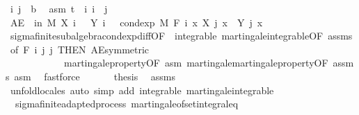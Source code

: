 \begin{isabellebody}
\ i\ j\ {\isacharcolon}{\kern0pt}{\isacharcolon}{\kern0pt}\ {\isacharprime}{\kern0pt}b\ \isamarkupfalse%
\ asm{\isacharcolon}{\kern0pt}\ {\isachardoublequoteopen}t\ {\isasymle}\ i{\isachardoublequoteclose}\ {\isachardoublequoteopen}i\ {\isasymle}\ j{\isachardoublequoteclose}\isanewline
\ \ \ \ \isamarkupfalse%
\ {\isachardoublequoteopen}AE\ {\isasymxi}\ in\ M{\isachardot}{\kern0pt}\ X\ i\ {\isasymxi}\ {\isacharminus}{\kern0pt}\ Y\ i\ {\isasymxi}\ {\isacharequal}{\kern0pt}\ cond{\isacharunderscore}{\kern0pt}exp\ M\ {\isacharparenleft}{\kern0pt}F\ i{\isacharparenright}{\kern0pt}\ {\isacharparenleft}{\kern0pt}{\isasymlambda}x{\isachardot}{\kern0pt}\ X\ j\ x\ {\isacharminus}{\kern0pt}\ Y\ j\ x{\isacharparenright}{\kern0pt}\ {\isasymxi}{\isachardoublequoteclose}\ \isanewline
\ \ \ \ \ \ \isamarkupfalse%
\ sigma{\isacharunderscore}{\kern0pt}finite{\isacharunderscore}{\kern0pt}subalgebra{\isachardot}{\kern0pt}cond{\isacharunderscore}{\kern0pt}exp{\isacharunderscore}{\kern0pt}diff{\isacharbrackleft}{\kern0pt}OF\ {\isacharunderscore}{\kern0pt}\ integrable\ martingale{\isachardot}{\kern0pt}integrable{\isacharbrackleft}{\kern0pt}OF\ assms{\isacharbrackright}{\kern0pt}{\isacharcomma}{\kern0pt}\ of\ {\isachardoublequoteopen}F\ i{\isachardoublequoteclose}\ j\ j{\isacharcomma}{\kern0pt}\ THEN\ AE{\isacharunderscore}{\kern0pt}symmetric{\isacharbrackright}{\kern0pt}\ \isanewline
\ \ \ \ \ \ \ \ \ \ \ \ martingale{\isacharunderscore}{\kern0pt}property{\isacharbrackleft}{\kern0pt}OF\ asm{\isacharbrackright}{\kern0pt}\ martingale{\isachardot}{\kern0pt}martingale{\isacharunderscore}{\kern0pt}property{\isacharbrackleft}{\kern0pt}OF\ assms\ asm{\isacharbrackright}{\kern0pt}\ \isamarkupfalse%
\ fastforce\isanewline
\ \ \isacommand{{\isacharbraceright}{\kern0pt}}\isamarkupfalse%
\isanewline
\ \ \isamarkupfalse%
\ {\isacharquery}{\kern0pt}thesis\ \isamarkupfalse%
\ assms\ \isamarkupfalse%
\ {\isacharparenleft}{\kern0pt}unfold{\isacharunderscore}{\kern0pt}locales{\isacharparenright}{\kern0pt}\ {\isacharparenleft}{\kern0pt}auto\ simp\ add{\isacharcolon}{\kern0pt}\ integrable\ martingale{\isachardot}{\kern0pt}integrable{\isacharparenright}{\kern0pt}\ \ \isanewline
{}\isamarkupfalse%
%
\endisatagproof
{\isafoldproof}%
%
\isadelimproof
\isanewline
%
\endisadelimproof
\isanewline
{}\isamarkupfalse%
\isanewline
\isanewline
{}\isamarkupfalse%
\ {\isacharparenleft}{\kern0pt}\ sigma{\isacharunderscore}{\kern0pt}finite{\isacharunderscore}{\kern0pt}adapted{\isacharunderscore}{\kern0pt}process{\isacharparenright}{\kern0pt}\ martingale{\isacharunderscore}{\kern0pt}of{\isacharunderscore}{\kern0pt}set{\isacharunderscore}{\kern0pt}integral{\isacharunderscore}{\kern0pt}eq{\isacharcolon}{\kern0pt}\isanewline

\end{isabellebody}
